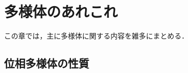 \documentclass[geometry_main]{subfiles}
\begin{document}
\setcounter{chapter}{1}

\chapter{多様体のあれこれ}

この章では，主に多様体に関する内容を雑多にまとめる．




\section{位相多様体の性質}
\end{document}
